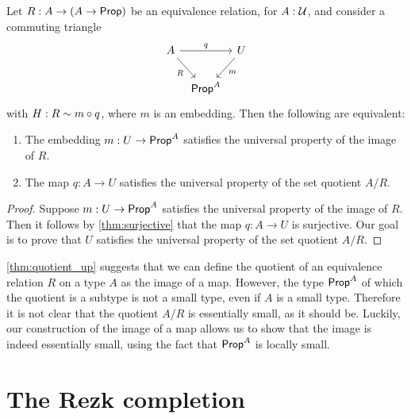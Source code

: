 \begin{prp}\label{thm:quotient_up}
Let $R:A\to (A\to \mathsf{Prop})$ be an equivalence relation, for $A:\mathcal{U}$, and consider a commuting triangle
\begin{equation*}
\begin{tikzcd}[column sep=tiny]
A \arrow[rr,"q"] \arrow[dr,swap,"R"] & & U \arrow[dl,"m"] \\
& \prop^A
\end{tikzcd}
\end{equation*}
with $H:R\sim m\circ q$, where $m$ is an embedding. Then the following are equivalent:
\begin{enumerate}
\item The embedding $m:U\to \mathsf{Prop}^A$ satisfies the universal property of the image of $R$.
\item The map $q:A\to U$ satisfies the universal property of the set quotient $A/R$.
\end{enumerate}
\end{prp}

\begin{proof}
Suppose $m:U\to \mathsf{Prop}^A$ satisfies the universal property of the image of $R$. Then it follows by \cref{thm:surjective} that the map $q:A\to U$ is surjective. Our goal is to prove that $U$ satisfies the universal property of the set quotient $A/R$. 
\end{proof}

\begin{rmk}
\cref{thm:quotient_up} suggests that we can define the quotient of an equivalence relation $R$ on a type $A$ as the image of a map. However, the type $\mathsf{Prop}^A$ of which the quotient is a subtype is not a small type, even if $A$ is a small type.
Therefore it is not clear that the quotient $A/R$ is essentially small, as it should be. Luckily, our construction of the image of a map allows us to show that the image is indeed essentially small, using the fact that $\mathsf{Prop}^A$ is locally small.
\end{rmk}

\section{The Rezk completion}


